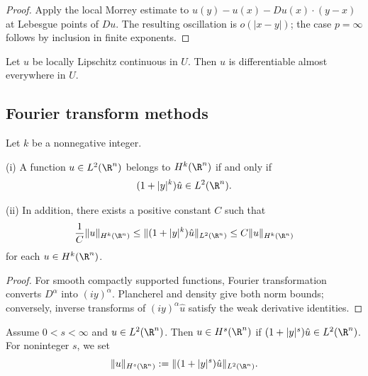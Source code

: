\begin{proof}
\sketch Apply the local Morrey estimate to $u(y)-u(x)-Du(x)\cdot(y-x)$ at Lebesgue points of $Du$. The resulting oscillation is $o(|x-y|)$; the case $p=\infty$ follows by inclusion in finite exponents.
\end{proof}

\begin{theorem}
\label{thm:rademachers-theorem}
Let $u$ be locally Lipschitz continuous in $U$. Then $u$ is differentiable almost everywhere in $U$.
\end{theorem}

\subsection{Fourier transform methods}

\begin{theorem}
\label{thm:characterization-hk-fourier-transform}
Let $k$ be a nonnegative integer.

(i) A function $u \in L^2(\R^n)$ belongs to $H^k(\R^n)$ if and only if
$$(1 + |y|^k)\hat{u} \in L^2(\R^n).$$

(ii) In addition, there exists a positive constant $C$ such that
$$\frac{1}{C}\|u\|_{H^k(\R^n)} \le \|(1 + |y|^k)\hat{u}\|_{L^2(\R^n)} \le C\|u\|_{H^k(\R^n)}$$
for each $u \in H^k(\R^n)$.
\end{theorem}

\begin{proof}
\sketch For smooth compactly supported functions, Fourier transformation converts $D^\alpha$ into $(iy)^\alpha$. Plancherel and density give both norm bounds; conversely, inverse transforms of $(iy)^\alpha\hat u$ satisfy the weak derivative identities.
\end{proof}

\begin{definition}
\label{def:fractional-sobolev-space}
Assume $0 < s < \infty$ and $u \in L^2(\R^n)$. Then $u \in H^s(\R^n)$ if $(1 + |y|^s)\hat u \in L^2(\R^n)$. For noninteger $s$, we set
$$\|u\|_{H^s(\R^n)} := \|(1 + |y|^s)\hat u\|_{L^2(\R^n)}.$$
\end{definition}

